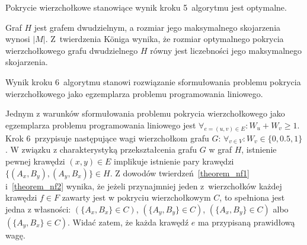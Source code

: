 \begin{theorem}\label{theorem_nf2}
  Pokrycie wierzchołkowe stanowiące wynik kroku 5\ algorytmu jest optymalne.
\end{theorem}
\begin{bproof}
  Graf $H$ jest grafem dwudzielnym, a rozmiar jego maksymalnego skojarzenia wynosi $|M|$.
  Z~twierdzenia K\"oniga wynika, że rozmiar optymalnego pokrycia wierzchołkowego grafu dwudzielnego $H$ równy jest liczebności jego maksymalnego skojarzenia.
\end{bproof}
\begin{theorem}
  Wynik kroku 6~algorytmu stanowi rozwiązanie sformułowania problemu pokrycia wierzchołkowego jako egzemplarza problemu programowania liniowego.
\end{theorem}
\begin{bproof}
  Jednym z warunków sformułowania problemu pokrycia wierzchołkowego jako egzemplarza problemu programowania liniowego jest $\forall_{e=(u,v) \in E}: W_u + W_v \geq 1$.
  Krok 6\ przypisuje następujące wagi wierzchołkom grafu $G$: $\forall_{v \in V}: W_v \in \{0, 0.5, 1\}$.
  W związku z charakterystyką przekształcenia grafu $G$ w graf $H$, istnienie pewnej krawędzi $(x,y) \in E$ implikuje istnienie pary krawędzi $\{(A_x, B_y), (A_y, B_x)\} \in H$.
  Z dowodów twierdzeń~\ref{theorem_nf1} i~\ref{theorem_nf2} wynika, że jeżeli przynajmniej jeden z~wierzchołków każdej krawędzi $f \in F$ zawarty jest w pokryciu wierzchołkowym $C$, to spełniona jest jedna z własności: $(\{A_x, B_x\} \in C)$, $(\{A_y, B_y\} \in C)$, $(\{A_x, B_y\} \in C)$ albo $(\{A_y, B_x\} \in C)$.
  Widać zatem, że każda krawędź $e$ ma przypisaną prawidłową wagę.
\end{bproof}
